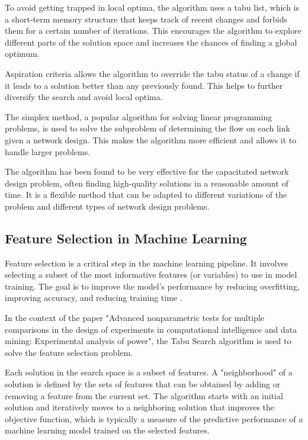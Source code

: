 \documentclass[conference]{IEEEtran}
\begin{document}
To avoid getting trapped in local optima, the algorithm uses a tabu list, which is a short-term memory structure that keeps track of recent changes and forbids them for a certain number of iterations. This encourages the algorithm to explore different parts of the solution space and increases the chances of finding a global optimum.

Aspiration criteria allows the algorithm to override the tabu status of a change if it leads to a solution better than any previously found. This helps to further diversify the search and avoid local optima.

The simplex method, a popular algorithm for solving linear programming problems, is used to solve the subproblem of determining the flow on each link given a network design. This makes the algorithm more efficient and allows it to handle larger problems.

The algorithm has been found to be very effective for the capacitated network design problem, often finding high-quality solutions in a reasonable amount of time. It is a flexible method that can be adapted to different variations of the problem and different types of network design problems.

\subsection{Feature Selection in Machine Learning}

Feature selection is a critical step in the machine learning pipeline. It involves selecting a subset of the most informative features (or variables) to use in model training. The goal is to improve the model's performance by reducing overfitting, improving accuracy, and reducing training time \cite{garcia2010advanced}.

In the context of the paper "Advanced nonparametric tests for multiple comparisons in the design of experiments in computational intelligence and data mining: Experimental analysis of power", the Tabu Search algorithm is used to solve the feature selection problem.

Each solution in the search space is a subset of features. A "neighborhood" of a solution is defined by the sets of features that can be obtained by adding or removing a feature from the current set. The algorithm starts with an initial solution and iteratively moves to a neighboring solution that improves the objective function, which is typically a measure of the predictive performance of a machine learning model trained on the selected features.
\end{document}
